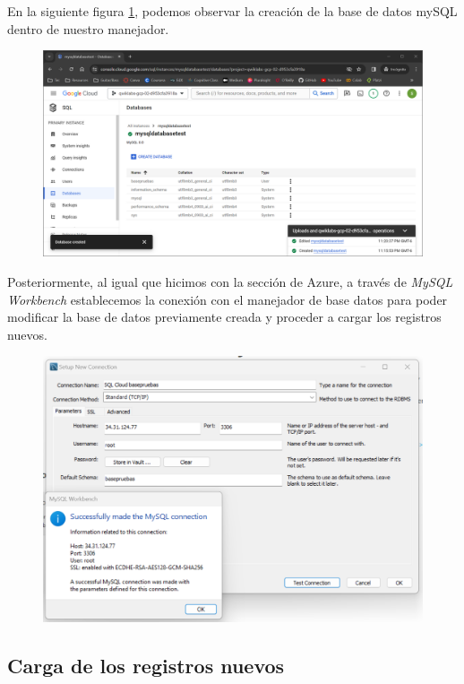 \documentclass[12pt,a4paper]{article}
\begin{document}
En la siguiente figura \ref{fig:2_2_2_Google_DBMS}, podemos observar la creación de la base de datos mySQL dentro de nuestro manejador.

\begin{figure}[H]
    \centering
    \includegraphics[width=.7\linewidth]{M4_Servicios_Cómputo_en_la_Nube/Tarea_6_Creación_sistema_administración_Base_de_Datos/reporte/figuras/2_2_2_Google_DBMS.png}
    \label{fig:2_2_2_Google_DBMS}
\end{figure}

Posteriormente, al igual que hicimos con la sección de Azure, a través de \textit{MySQL Workbench} establecemos la conexión con el manejador de base datos para poder modificar la base de datos previamente creada y proceder a cargar los registros nuevos.

\begin{figure}[H]
    \centering
    \includegraphics[width=.7\linewidth]{M4_Servicios_Cómputo_en_la_Nube/Tarea_6_Creación_sistema_administración_Base_de_Datos/reporte/figuras/2_2_3_Google_DBMS.png}
    \label{fig:2_2_3_Google_DBMS}
\end{figure}


\subsection{Carga de los registros nuevos}
\end{document}
